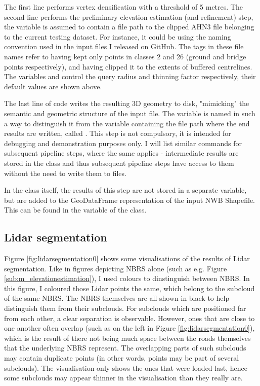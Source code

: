 The first line performs vertex densification with a threshold of 5 metres. The second line performs the preliminary elevation estimation (and refinement) step, the variable  is assumed to contain a file path to the clipped AHN3 file belonging to the current testing dataset. For instance, it could be  using the naming convention used in the input files I released on GitHub. The tags  in these file names refer to having kept only points in classes 2 and 26 (ground and bridge points respectively), and having clipped it to the extents of buffered centrelines. The variables  and  control the query radius and thinning factor respectively, their default values are shown above.

The last line of code writes the resulting 3D geometry to disk, "mimicking" the semantic and geometric structure of the input file. The variable is named in such a way to distinguish it from the variable containing the file path where the end results are written, called . This step is not compulsory, it is intended for debugging and demonstration purposes only. I will list similar commands for subsequent pipeline steps, where the same applies - intermediate results are stored in the class and thus subsequent pipeline steps have access to them without the need to write them to files.

In the class itself, the results of this step are not stored in a separate variable, but are added to the GeoDataFrame representation of the input NWB Shapefile. This can be found in the  variable of the  class.

\subsection{Lidar segmentation}
\label{sub:r_lidarsegmentation}

Figure \ref{fig:lidarsegmentation0} shows some visualisations of the results of Lidar segmentation. Like in figures depicting NBRS alone (such as e.g. Figure \ref{sub:m_elevationestimation}), I used colours to dinstinguish between NBRS. In this figure, I coloured those Lidar points the same, which belong to the subcloud of the same NBRS. The NBRS themselves are all shown in black to help distinguish them from their subclouds. For subclouds which are positioned far from each other, a clear separation is observable. However, ones that are close to one another often overlap (such as on the left in Figure \ref{fig:lidarsegmentation0}), which is the result of there not being much space between the roads themselves that the underlying NBRS represent. The overlapping parts of such subclouds may contain duplicate points (in other words, points may be part of several subclouds). The visualisation only shows the ones that were loaded last, hence some subclouds may appear thinner in the visualisation than they really are.

